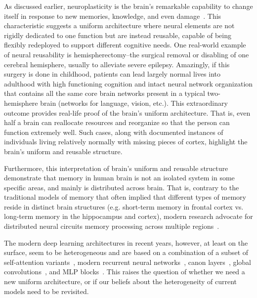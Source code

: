  As discussed earlier, neuroplasticity is the brain's remarkable capability to change itself in response to new memories, knowledge, and even damage~\citep{pascual2005plastic, johnston2009plasticity}. This characteristic suggests a uniform architecture where neural elements are not rigidly dedicated to one function but are instead reusable, capable of being flexibly redeployed to support different cognitive needs. One real-world example of neural reusability is hemispherectomy–the surgical removal or disabling of one cerebral hemisphere, usually to alleviate severe epilepsy. Amazingly, if this surgery is done in childhood, patients can lead largely normal lives into adulthood with high functioning cognition and intact neural network organization that contains all the same core brain networks present in a typical two-hemisphere brain (networks for language, vision, etc.). This extraordinary outcome provides real-life proof of the brain’s uniform architecture. That is, even half a brain can reallocate resources and reorganize so that the person can function extremely well. Such cases, along with documented instances of individuals living relatively normally with missing pieces of cortex, highlight the brain's uniform and reusable structure.


Furthermore, this interpretation of brain's uniform and reusable structure demonstrate that memory in human brain is not an isolated system in some specific areas, and mainly is distributed across brain. That is, contrary to the traditional models of memory that often implied that different types of memory reside in distinct brain structures (e.g. short-term memory in frontal cortex vs. long-term memory in the hippocampus and cortex), modern research advocate for distributed neural circuits memory processing across multiple regions~\citep{christophel2017distributed, roy2022brain, kitamura2017engrams}. 


The modern deep learning architectures in recent years, however, at least on the surface, seem to be heterogeneous and are based on a combination of a subset of self-attention variants~\citep{transformers}, modern recurrent neural networks~\citep{katharopoulos2020transformers, schlag2021linear, peng2025rwkv7, behrouz2024titans}, canon layers~\citep{Allenzhu2025-canon}, global convolutions~\citep{poli2023hyena, hasani2023liquid}, and MLP blocks~\citep{shazeer2020glu}. This raises the question of whether we need a new uniform architecture, or if our beliefs about the heterogeneity of current models need to be revisited.




